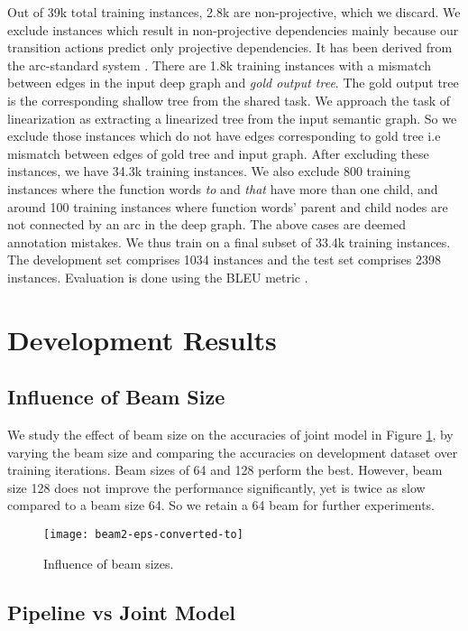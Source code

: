 \documentclass[11pt]{article}
\begin{document}
Out of 39k total training instances, 2.8k are non-projective, which we discard. We exclude instances which result in non-projective dependencies mainly because our transition actions predict only projective dependencies. It has been derived from the arc-standard system \cite{J08-4003}. There are 1.8k training instances with a mismatch between edges in the input deep graph and {\it gold output tree}. The gold output tree is the corresponding shallow tree from the shared task. We approach the task of linearization as extracting a linearized tree from the input semantic graph. So we exclude those instances which do not have edges corresponding to gold tree i.e mismatch between edges of gold tree and input graph. After excluding these instances, we have 34.3k training instances. We also exclude 800 training instances where the function words {\it to} and {\it that} have more than one child, and around 100 training instances where function words' parent and child nodes are not connected by an arc in the deep graph. The above cases are deemed annotation mistakes. We thus train on a final subset of 33.4k training instances. The development set comprises 1034 instances and the test set comprises 2398 instances.  Evaluation is done using the BLEU metric \cite{P02-1040}. 

\section{Development Results}
\subsection{Influence of Beam Size}
We study the effect of beam size on the accuracies of joint model in Figure \ref{fig:dev-res-beam}, by varying the beam size and comparing the accuracies on development dataset over training iterations. Beam sizes of 64 and 128 perform the best. However, beam size 128 does not improve the performance significantly, yet is twice as slow compared to a beam size 64. So we retain a 64 beam  for further experiments.  

\begin{figure}[t]
\centering
\small
\texttt{[image: beam2-eps-converted-to]}
\caption{Influence of beam sizes.}\label{fig:dev-res-beam}
\end{figure}

\subsection{Pipeline vs Joint Model}
\end{document}
